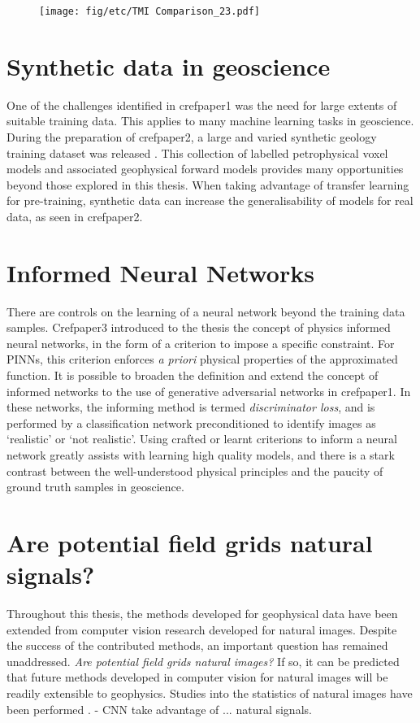 \documentclass[manuscript.tex]{subfiles}
\begin{document}
\begin{figure}[hbt]
    \texttt{[image: fig/etc/TMI Comparison\_23.pdf]} %
    \caption{}
    \label{fig:rdncomp}
\end{figure}

\section{Synthetic data in geoscience}
One of the challenges identified in cref{paper1} was the need for large extents of suitable training data.
This applies to many machine learning tasks in geoscience.
During the preparation of cref{paper2}, a large and varied synthetic geology training dataset was released \parencite{jessellNoddyverseMassiveData2022}.
This collection of labelled petrophysical voxel models and associated geophysical forward models provides many opportunities beyond those explored in this thesis.
When taking advantage of transfer learning for pre-training, synthetic data can increase the generalisability of models for real data, as seen in cref{paper2}.


\section{Informed Neural Networks}
There are controls on the learning of a neural network beyond the training data samples.
Cref{paper3} introduced to the thesis the concept of physics informed neural networks, in the form of a criterion to impose a specific constraint.
For PINNs, this criterion enforces \emph{a priori} physical properties of the approximated function.
It is possible to broaden the definition and extend the concept of informed networks to the use of generative adversarial networks in cref{paper1}.
In these networks, the informing method is termed \emph{discriminator loss}, and is performed by a classification network preconditioned to identify images as `realistic' or `not realistic'.
Using crafted or learnt criterions to inform a neural network greatly assists with learning high quality models, and there is a stark contrast between the well-understood physical principles and the paucity of ground truth samples in geoscience.

\section{Are potential field grids natural signals?}
Throughout this thesis, the methods developed for geophysical data have been extended from computer vision research developed for natural images.
Despite the success of the contributed methods, an important question has remained unaddressed.
\emph{Are potential field grids natural images?}
If so, it can be predicted that future methods developed in computer vision for natural images will be readily extensible to geophysics.
Studies into the statistics of natural images have been performed \parencite{simoncelliNaturalImageStatistics2001,rudermanStatisticsNaturalImages1994,tolhurstAmplitudeSpectraNatural1992}.
\Textcite{lecunDeepLearning2015} - CNN take advantage of ... natural signals. 

\end{document}
